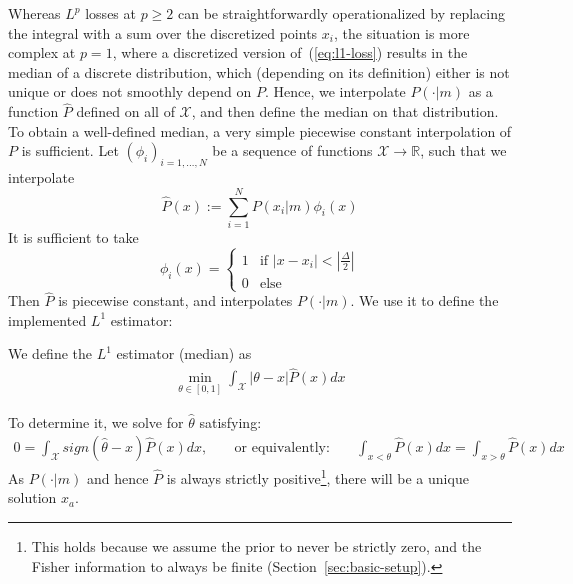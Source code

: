 Whereas $L^p$ losses at $p\geq 2$ can be straightforwardly operationalized by replacing the integral with a sum over the discretized points $x_i$, the situation is more complex at $p=1$, where a discretized version of~(\ref{eq:l1-loss}) results in the median of a discrete distribution, which (depending on its definition) either is not unique or does not smoothly depend on $P$.
Hence, we interpolate $P(\cdot|m)$ as a function $\widehat{P}$ defined on all of $\mathcal{X}$, and then define the median on that distribution. %
To obtain a well-defined median, a very simple piecewise constant interpolation of $P$ is sufficient.
Let $(\phi_i)_{i=1, \dots, N}$ be a sequence of functions $\mathcal{X} \rightarrow \mathbb{R}$, such that we interpolate
\begin{equation}
    \widehat{P}(x) := \sum_{i=1}^N P(x_i|m) \phi_i(x)
\end{equation}
It is sufficient to take
\begin{equation}
    \phi_i(x) = \begin{cases}
        1 & \text{if } |x-x_i| < |\frac{\Delta}{2}| \\
        0 & \text{else}
    \end{cases}
\end{equation}
Then $\widehat{P}$ is piecewise constant, and interpolates $P(\cdot|m)$.
We use it to define the implemented $L^1$ estimator:
\begin{defin}
We define the $L^1$ estimator (median) as
\begin{align}\label{eq:interval-l1-estimator}
     \min_{\theta \in [0,1]} \int_{\mathcal{X}} |\theta-x| \widehat{P}(x) dx 
\end{align}
\end{defin}
To determine it, we solve for $\widehat{\theta}$ satisfying:
\begin{align}
   0=  \int_{\mathcal{X}} sign(\widehat{\theta}-x) \widehat{P}(x) dx, 
\ \ \ \ \ \ \ \text{ or equivalently: } \ \ \ \ \ \ \ 
\int_{x<\theta} \widehat{P}(x) dx  = \int_{x>\theta} \widehat{P}(x) dx 
\end{align}
As $P(\cdot|m)$ and hence $\widehat{P}$ is always strictly positive\footnote{This holds because we assume the prior to never be strictly zero, and the Fisher information to always be finite (Section~\ref{sec:basic-setup}).}, there will be a unique solution $x_a$.
